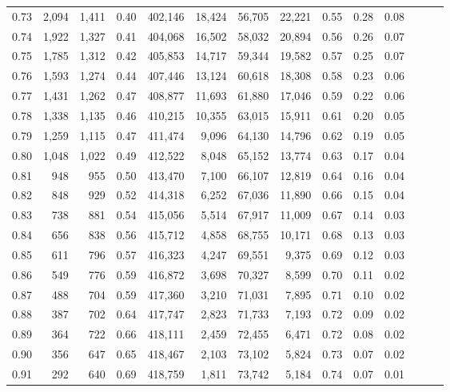 \begin{tabular}{rrrrrrrrrrrrrr}
0.73 &  2,094 &  1,411 &  0.40 &  402,146 &   18,424 &  56,705 &  22,221 &  0.55 &  0.28 &      0.08 \\
0.74 &  1,922 &  1,327 &  0.41 &  404,068 &   16,502 &  58,032 &  20,894 &  0.56 &  0.26 &      0.07 \\
0.75 &  1,785 &  1,312 &  0.42 &  405,853 &   14,717 &  59,344 &  19,582 &  0.57 &  0.25 &      0.07 \\
0.76 &  1,593 &  1,274 &  0.44 &  407,446 &   13,124 &  60,618 &  18,308 &  0.58 &  0.23 &      0.06 \\
0.77 &  1,431 &  1,262 &  0.47 &  408,877 &   11,693 &  61,880 &  17,046 &  0.59 &  0.22 &      0.06 \\
0.78 &  1,338 &  1,135 &  0.46 &  410,215 &   10,355 &  63,015 &  15,911 &  0.61 &  0.20 &      0.05 \\
0.79 &  1,259 &  1,115 &  0.47 &  411,474 &    9,096 &  64,130 &  14,796 &  0.62 &  0.19 &      0.05 \\
0.80 &  1,048 &  1,022 &  0.49 &  412,522 &    8,048 &  65,152 &  13,774 &  0.63 &  0.17 &      0.04 \\
0.81 &    948 &    955 &  0.50 &  413,470 &    7,100 &  66,107 &  12,819 &  0.64 &  0.16 &      0.04 \\
0.82 &    848 &    929 &  0.52 &  414,318 &    6,252 &  67,036 &  11,890 &  0.66 &  0.15 &      0.04 \\
0.83 &    738 &    881 &  0.54 &  415,056 &    5,514 &  67,917 &  11,009 &  0.67 &  0.14 &      0.03 \\
0.84 &    656 &    838 &  0.56 &  415,712 &    4,858 &  68,755 &  10,171 &  0.68 &  0.13 &      0.03 \\
0.85 &    611 &    796 &  0.57 &  416,323 &    4,247 &  69,551 &   9,375 &  0.69 &  0.12 &      0.03 \\
0.86 &    549 &    776 &  0.59 &  416,872 &    3,698 &  70,327 &   8,599 &  0.70 &  0.11 &      0.02 \\
0.87 &    488 &    704 &  0.59 &  417,360 &    3,210 &  71,031 &   7,895 &  0.71 &  0.10 &      0.02 \\
0.88 &    387 &    702 &  0.64 &  417,747 &    2,823 &  71,733 &   7,193 &  0.72 &  0.09 &      0.02 \\
0.89 &    364 &    722 &  0.66 &  418,111 &    2,459 &  72,455 &   6,471 &  0.72 &  0.08 &      0.02 \\
0.90 &    356 &    647 &  0.65 &  418,467 &    2,103 &  73,102 &   5,824 &  0.73 &  0.07 &      0.02 \\
0.91 &    292 &    640 &  0.69 &  418,759 &    1,811 &  73,742 &   5,184 &  0.74 &  0.07 &      0.01 \\

\end{tabular}
